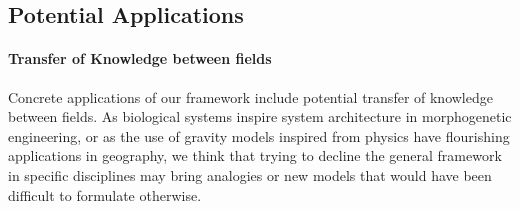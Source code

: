 \documentclass[fleqn,10pt]{wlscirep}
\begin{document}
\subsection*{Potential Applications}


\paragraph{Transfer of Knowledge between fields}


Concrete applications of our framework include potential transfer of knowledge between fields. As biological systems inspire system architecture in morphogenetic engineering, or as the use of gravity models inspired from physics have flourishing applications in geography, we think that trying to decline the general framework in specific disciplines may bring analogies or new models that would have been difficult to formulate otherwise.
























%






\end{document}
